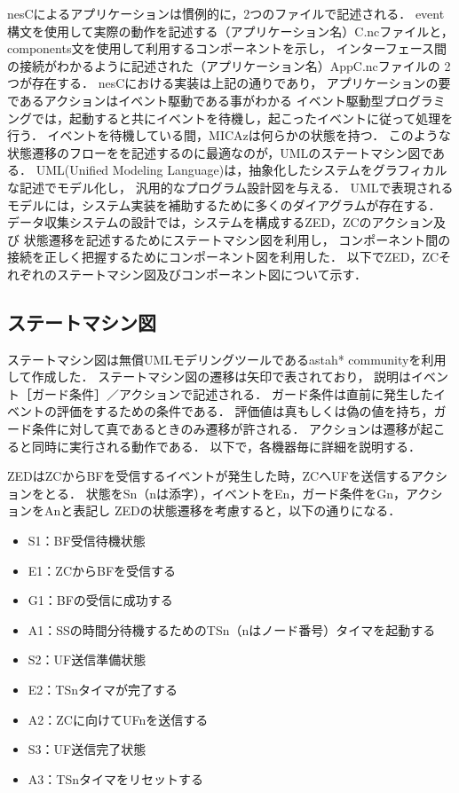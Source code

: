 \documentclass[12pt]{jreport}
\begin{document}
nesCによるアプリケーションは慣例的に，2つのファイルで記述される．
event構文を使用して実際の動作を記述する（アプリケーション名）C.ncファイルと，
components文を使用して利用するコンポーネントを示し，
インターフェース間の接続がわかるように記述された（アプリケーション名）AppC.ncファイルの
2つが存在する．
nesCにおける実装は上記の通りであり，
アプリケーションの要であるアクションはイベント駆動である事がわかる
イベント駆動型プログラミングでは，起動すると共にイベントを待機し，起こったイベントに従って処理を行う．
イベントを待機している間，MICAzは何らかの状態を持つ．
このような状態遷移のフローをを記述するのに最適なのが，UMLのステートマシン図である．
UML(Unified Modeling Language)は，抽象化したシステムをグラフィカルな記述でモデル化し，
汎用的なプログラム設計図を与える．
UMLで表現されるモデルには，システム実装を補助するために多くのダイアグラムが存在する．
データ収集システムの設計では，システムを構成するZED，ZCのアクション及び
状態遷移を記述するためにステートマシン図を利用し，
コンポーネント間の接続を正しく把握するためにコンポーネント図を利用した．
以下でZED，ZCそれぞれのステートマシン図及びコンポーネント図について示す．

\subsection{ステートマシン図}
\label{ssec:statemachine}
ステートマシン図は無償UMLモデリングツールであるastah* communityを利用して作成した．
ステートマシン図の遷移は矢印で表されており，
説明はイベント［ガード条件］／アクションで記述される．
ガード条件は直前に発生したイベントの評価をするための条件である．
評価値は真もしくは偽の値を持ち，ガード条件に対して真であるときのみ遷移が許される．
アクションは遷移が起こると同時に実行される動作である．
以下で，各機器毎に詳細を説明する．

ZEDはZCからBFを受信するイベントが発生した時，ZCへUFを送信するアクションをとる．
状態をSn（nは添字），イベントをEn，ガード条件をGn，アクションをAnと表記し
ZEDの状態遷移を考慮すると，以下の通りになる．

\begin{itemize}
 \item S1：BF受信待機状態
 \item E1：ZCからBFを受信する
 \item G1：BFの受信に成功する
 \item A1：SSの時間分待機するためのTSn（nはノード番号）タイマを起動する
 \item S2：UF送信準備状態
 \item E2：TSnタイマが完了する
 \item A2：ZCに向けてUFnを送信する
 \item S3：UF送信完了状態
 \item A3：TSnタイマをリセットする
\end{itemize}
\end{document}

